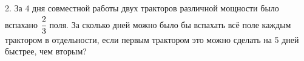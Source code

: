 2. За 4 дня совместной работы двух тракторов различной мощности было вспахано $\cfrac{2}{3}$ поля. За сколько дней можно было бы вспахать всё поле каждым трактором в отдельности, если первым трактором это можно сделать на 5 дней быстрее, чем вторым?\\
